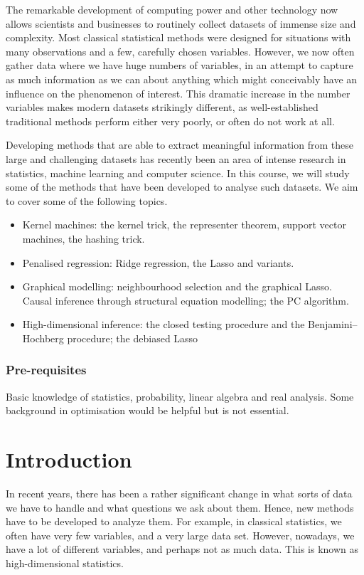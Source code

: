 \documentclass[a4paper]{article}
\begin{document}
\maketitle
{\small
\setlength{\parindent}{0em}
\setlength{\parskip}{1em}

The remarkable development of computing power and other technology now allows scientists and businesses to routinely collect datasets of immense size and complexity. Most classical statistical methods were designed for situations with many observations and a few, carefully chosen variables. However, we now often gather data where we have huge numbers of variables, in an attempt to capture as much information as we can about anything which might conceivably have an influence on the phenomenon of interest. This dramatic increase in the number variables makes modern datasets strikingly different, as well-established traditional methods perform either very poorly, or often do not work at all.

Developing methods that are able to extract meaningful information from these large and challenging datasets has recently been an area of intense research in statistics, machine learning and computer science. In this course, we will study some of the methods that have been developed to analyse such datasets. We aim to cover some of the following topics.

\begin{itemize}
  \item Kernel machines: the kernel trick, the representer theorem, support vector machines, the hashing trick.
  \item Penalised regression: Ridge regression, the Lasso and variants.
  \item Graphical modelling: neighbourhood selection and the graphical Lasso. Causal inference through structural equation modelling; the PC algorithm.
  \item High-dimensional inference: the closed testing procedure and the Benjamini--Hochberg procedure; the debiased Lasso
\end{itemize}

\subsubsection*{Pre-requisites}
Basic knowledge of statistics, probability, linear algebra and real analysis. Some background in optimisation would be helpful but is not essential.
}
\tableofcontents

\section{Introduction}
In recent years, there has been a rather significant change in what sorts of data we have to handle and what questions we ask about them. Hence, new methods have to be developed to analyze them. For example, in classical statistics, we often have very few variables, and a very large data set. However, nowadays, we have a lot of different variables, and perhaps not as much data. This is known as high-dimensional statistics.
\end{document}
